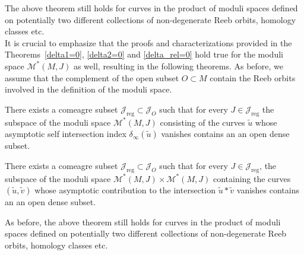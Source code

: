 \documentclass[11pt, a4paper]{amsart}
\newcommand{\cJ}{\mathcal{J}}
\newcommand{\cM}{\mathcal{M}}
\begin{document}
The above theorem still holds for curves in the product of moduli spaces defined on potentially two different collections of non-degenerate Reeb orbits, homology classes etc.\\

It is crucial to emphasize that the proofs and characterizations provided in the Theorems~\ref{delta1=0}, \ref{delta2=0} and \ref{delta_rel=0} hold true for the moduli space $\cM^*(M,J)$ as well, resulting in the following theorems. As before, we assume that the complement of the open subset $O\subset M$ contain the Reeb orbits involved in the definition of the moduli space.

\begin{theorem}\label{maintheorem3}
There exists a comeagre subset $\cJ_{\mathrm{reg}} \subset \cJ_O$ such that for every $J \in \cJ_{\mathrm{reg}}$ the subspace of the moduli space $\cM^*(M,J)$ consisting of the curves $\tilde{u}$ whose asymptotic self intersection index $\delta_{\infty}(\tilde{u})$ vanishes contains an an open dense subset.
\end{theorem}

\begin{theorem}\label{maintheorem4}
There exists a comeagre subset $\cJ_{\mathrm{reg}} \subset \cJ_O$ such that for every $J \in \cJ_{\mathrm{reg}}$, the subspace of the moduli space $\cM^*(M,J) \times \cM^*(M,J) $ containing the curves $(\tilde{u},\tilde{v})$ whose asymptotic contribution to the intersection $\tilde{u}*\tilde{v}$ vanishes contains an an open dense subset.
\end{theorem}

As before, the above theorem still holds for curves in the product of moduli spaces defined on potentially two different collections of non-degenerate Reeb orbits, homology classes etc.

\printbibliography
\end{document}
